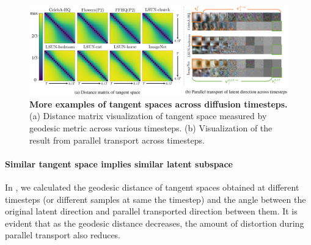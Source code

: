 

\begin{figure}[!t]
\centering
    \includegraphics[width=0.95\linewidth]{figure/evolution-t-appendix.pdf}
    \vspace{-0.5em}
    \caption{
    \textbf{More examples of tangent spaces across diffusion timesteps.} 
    (a) Distance matrix visualization of tangent space measured by geodesic metric across various timesteps.
    (b) Visualization of the result from parallel transport across timesteps.
    }
    \label{fig:evolution-t-appendix}
\end{figure}


\paragraph{Similar tangent space implies similar latent subspace}
In , we calculated the geodesic distance of tangent spaces obtained at different timesteps (or different samples at same the timestep) and the angle between the original latent direction and parallel transported direction between them.
It is evident that as the geodesic distance decreases, the amount of distortion during parallel transport also reduces.

